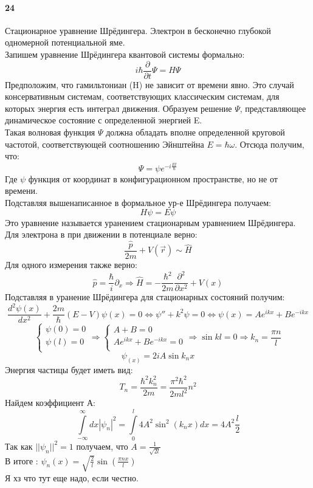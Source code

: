


\paragraph{24} 
Стационарное уравнение Шрёдингера. Электрон в бесконечно глубокой одномерной потенциальной яме.\\

Запишем уравнение Шрёдингера квантовой системы формально:
$$i\hbar\frac{\partial}{\partial t}\Psi=H\Psi$$
Предположим, что гамильтониан (H) не зависит от времени явно. Это случай консервативным системам, соответствующих классическим системам, для которых энергия есть интеграл движения. Образуем решение $\Psi$, представляющее динамическое состояние с определенной энергией E.\\
Такая волновая функция  $\Psi$ должна обладать вполне определенной круговой частотой, соответствующей соотношению Эйнштейна $E=\hbar \omega$. 
Отсюда получим, что:
$$\Psi=\psi e ^{-i\frac{Et}{\hbar}}$$
Где $\psi$ функция от координат в конфигурационном пространстве, но не от времени.\\
Подставляя вышенаписанное в формальное ур-е Шрёдингера получаем:
$$H\psi=E\psi$$
Это уравнение называется уранением стационарным уравнением Шрёдингера.\\
Для электрона в при движении в потенциале верно:
$$\frac{\hat{p}}{2m}+V(\vec{r})\sim \hat{H} $$
Для одного измерения также верно:
$$\hat{p}=\frac{\hbar}{i}\partial_x\Rightarrow\hat{H}=-\frac{\hbar^2}{2m}\frac{\partial^2}{\partial x^2}+V(x)$$
Подставляя в уранение Шрёдингера для стационарных состояний получим:
$$\frac{d^2\psi(x)}{dx^2}+\frac{2m}{\hbar}(E-V)\psi(x)=0 \Leftrightarrow \psi''+k^2\psi=0\Leftrightarrow \psi(x)=Ae^{ikx}+Be^{-ikx}$$
$$
\left\{
\begin{gathered}
\psi(0)=0\\
\psi(l)=0\\
\end{gathered}
\right. 
\Rightarrow
\left\{
\begin{gathered}
A+B=0\\
Ae^{ikx}+Be^{-ikx}=0\\
\end{gathered}
\right. 
\Rightarrow
\sin{kl}=0
\Rightarrow
k_n=\frac{\pi n}{l}
$$
$$\psi_(x)=2i A \sin{k_n x}$$
Энергия частицы будет иметь вид:
$$T_n=\frac{\hbar^2 k_n^2}{2m}=\frac{\pi^2\hbar^2 }{2ml^2}n^2$$
Найдем коэффициент А:
$$\int \limits^{\infty}_{-\infty}dx|\psi_n|^2=\int \limits^{l}_{0}4A^2\sin^2{(k_nx)} dx=4A^2\frac{l}{2}$$
Так как $||\psi_n||^2=1$ получаем, что $A=\frac{1}{\sqrt{2l}}$\\
В итоге : $\psi_n(x)=\sqrt{\frac{2}{l}}\sin{(\frac{\pi n x}{l})}$\\
Я хз что тут еще надо, если честно.\\
